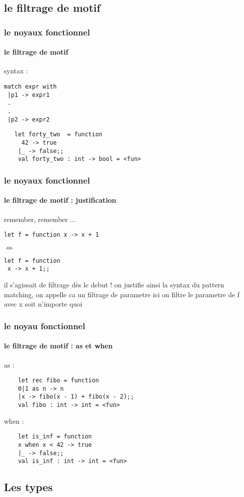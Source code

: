       \subsection{le filtrage de motif}
\begin{frame}[fragile]
  \frametitle{le noyaux fonctionnel}
  \framesubtitle{le filtrage de motif}
  syntax :
  \begin{minipage}[t]{5cm}
    \begin{lstlisting}
match expr with
 |p1 -> expr1
 .
 .
 |p2 -> expr2
 \end{lstlisting}
 \end{minipage}
 \begin{minipage}[t]{8cm}
   \begin{lstlisting}
   let forty_two  = function
     42 -> true
    |_ -> false;;
    val forty_two : int -> bool = <fun>
   \end{lstlisting} 
 \end{minipage}
\end{frame}
\begin{frame}[fragile]
  \frametitle{le noyaux fonctionnel}
  \framesubtitle{le filtrage de motif : justification}
remember, remember ...
\begin{lstlisting}
let f = function x -> x + 1 
\end{lstlisting}
\begin{center}
\begin{rotate}{90}
$\Leftrightarrow$
\end{rotate}
\end{center}
\begin{lstlisting}
let f = function 
 x -> x + 1;;
 \end{lstlisting}
  il s'agissait de filtrage dès le debut ! on justifie ainsi la syntax du pattern matching, 
  on appelle ca un filtrage de parametre ici on filtre le parametre de f avec x soit n'importe quoi
\end{frame}
\begin{frame}[fragile]
  \frametitle{le noyau fonctionnel}
  \framesubtitle{le filtrage de motif : as et when}
  \begin{itemize}
  \begin{minipage}[t]{5cm}
  \item
    as :
    \begin{lstlisting}
	let rec fibo = function 
 	0|1 as n -> n 
 	|x -> fibo(x - 1) + fibo(x - 2);; 
	val fibo : int -> int = <fun>
    \end{lstlisting}
  \end{minipage}
  \begin{minipage}[t]{5cm}
  \item
    when :
    \begin{lstlisting}
	let is_inf = function 
  	x when x < 42 -> true
 	|_ -> false;;
	val is_inf : int -> int = <fun>
    \end{lstlisting}
  \end{minipage}
  \end{itemize}
\end{frame}
      \subsection{Les types}
